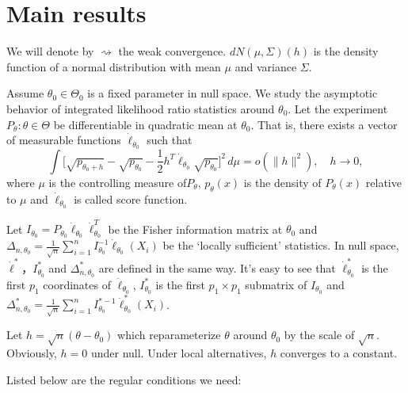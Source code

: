 \documentclass[review]{elsarticle}
\begin{document}
\section{Main results}

We will denote by $\rightsquigarrow$ the weak convergence. 
$dN(\mu,\Sigma)(h)$ is the density function of a normal distribution with mean $\mu$ and variance $\Sigma$.

Assume $\theta_0\in\Theta_0$ is a fixed parameter in null space. We study the asymptotic behavior of integrated likelihood ratio statistics around $\theta_0$.
Let the experiment $P_\theta : \theta\in \Theta$ be differentiable in quadratic mean at $\theta_0$. That is, there exists a vector of measurable functions $\dot{\ell}_{\theta_0}$ such that
\begin{equation}
    \int \big[\sqrt{p_{\theta_0+h}}-\sqrt{p_{\theta_0}}-\frac{1}{2}h^T\dot{\ell}_{\theta_0}\sqrt{p_{\theta_0}}\big]^2\, d\mu=o(\|h\|^2),\quad h\to 0,
\end{equation}
where $\mu$ is the controlling measure of$P_{\theta}$, $p_{\theta}(x)$ is the density of $P_{\theta}(x)$ relative to $\mu$ and $\dot{\ell}_{\theta_0}$ is called score function.

Let $I_{\theta_0}=P_{\theta_0}\dot{\ell}_{\theta_0}\dot{\ell}_{\theta_0}^T$ be the Fisher information matrix at $\theta_0$ and $\Delta_{n,\theta_0}=\frac{1}{\sqrt{n}}\sum_{i=1}^n I_{\theta_0}^{-1}\dot{\ell}_{\theta_0}(X_i)$ be the `locally sufficient' statistics. In null space, $\dot{\ell}^*$，$I^*_{\theta_0}$ and $\Delta_{n,\theta_0}^*$ are defined in the same way. It's easy to see that $\dot{\ell}^*_{\theta_0}$ is the first $p_1$
coordinates of $\dot{\ell}_{\theta_0}$, $I^*_{\theta_0}$ is the  first $p_1\times p_1$ submatrix of $I_{\theta_0}$ and $\Delta_{n,\theta_0}^*=\frac{1}{\sqrt{n}}\sum_{i=1}^n I_{\theta_0}^{*-1}\dot{\ell}^*_{\theta_0}(X_i)$.

Let $h=\sqrt{n}(\theta-\theta_0)$ which reparameterize   $\theta$ around $\theta_0$ by the scale of $\sqrt{n}$.  Obviously, $h=0$ under null. Under local alternatives, $h$ converges to a constant.

Listed below are the regular conditions we need:
\end{document}
